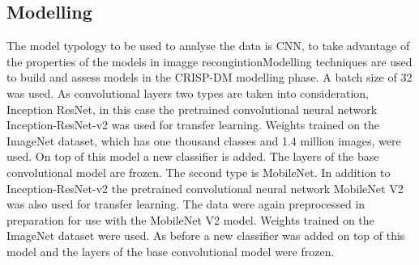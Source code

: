 \documentclass[conference]{IEEEtran}
\begin{document}
\subsection{Modelling}
The model typology to be used to analyse the data is CNN, to take advantage of the properties of the models in imagge recongintionModelling techniques are used to build and assess models in the CRISP-DM modelling phase. A batch size of 32 was used. As convolutional layers two types are taken into consideration, Inception ResNet, in this case the pretrained convolutional neural network Inception-ResNet-v2 was used for transfer learning. Weights trained on the ImageNet dataset, which has one thousand classes and 1.4 million images, were used. On top of this model a new classifier is added. The layers of the base convolutional model are frozen. The second type is MobileNet. In addition to Inception-ResNet-v2 the pretrained convolutional neural network MobileNet V2 was also used for transfer learning. The data were again preprocessed in preparation for use with the MobileNet V2 model. Weights trained on the ImageNet dataset were used. As before a new classifier was added on top of this model and the layers of the base convolutional model were frozen. 
\end{document}
